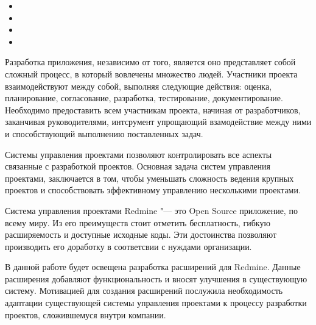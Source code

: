 
\begin{itemize}
	\item {}
	\item {}
	\item {}
	\item {}
\end{itemize} 
 

Разработка приложения, независимо от того, является оно  представляет собой сложный процесс, в который вовлечены множество людей. Участники проекта взаимодействуют между собой, выполняя следующие действия: оценка, планирование, согласование, разработка, тестирование, документирование. Необходимо предоставить всем участникам проекта, начиная от разработчиков, заканчивая руководителями, интсрумент упрощающий взамодействие между ними и способствующий выполнению поставленных задач.

Системы управления проектами позволяют контролировать все аспекты связанные с
разработкой проектов. Основная задача систем управления проектами, заключается в
том, чтобы уменьшать сложность ведения крупных проектов и способствовать
эффективному управлению несколькими проектами.  

Система управления проектами Redmine "--- это Open Source приложение,
 по всему миру. Из его преимуществ стоит
отметить бесплатность, гибкую расширяемость и доступные исходные коды. Эти достоинства позволяют производить его доработку в соответсвии с нуждами организации.

В данной работе будет освещена разработка расширений для Redmine. Данные
расширения добавляют функциональность и вносят улучшения в существующую
систему. Мотивацией для создания расширений послужила необходимость адаптации
существующей системы управления проектами к процессу разработки проектов,
сложившемуся внутри компании. 

